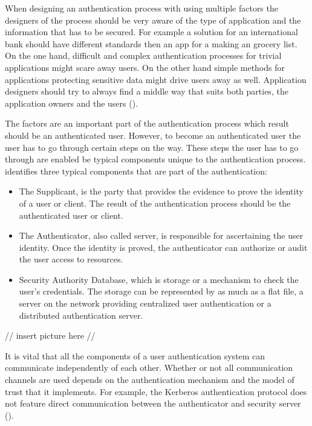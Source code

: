 When designing an authentication process with using multiple factors the designers of the process should be very aware of the type of application and the information that has to be secured. For example a solution for an international bank should have different standards then an app for a making an grocery list. On the one hand, difficult and complex authentication processes for trivial applications might scare away users. On the other hand simple methods for applications protecting sensitive data might drive users away as well. Application designers should try to always find a middle way that suits both parties, the application owners and the users (\cite{NIST:2017:DIG}). 

The factors are an important part of the authentication process which result should be an authenticated user. However, to become an authenticated user the user has to go through certain steps on the way. These steps the user has to go through are enabled be typical components unique to the authentication process. \cite{Todorov:2007:MUI} identifies three typical components that are part of the authentication:

 \begin{itemize}
 \item The Supplicant, is the party that provides the evidence to prove the identity of a user or client. The result of the authentication process should be the authenticated user or client.  
 \item The Authenticator, also called server, is responsible for ascertaining the user identity. Once the identity is proved, the authenticator can authorize or audit the user access to resources. 
 \item Security Authority Database, which is storage or  a mechanism to check the user's credentials. The storage can be represented by as much as a flat file, a server on the network providing centralized user authentication or a distributed authentication server. 
\end{itemize}

//
insert picture here
//

It is vital that all the components of a user authentication system can communicate independently of each other. Whether or not all communication channels are used depends on the authentication mechanism and the model of trust that it implements. For example, the Kerberos authentication protocol does not feature direct communication between the authenticator and security server (\cite{Todorov:2007:MUI}). 


